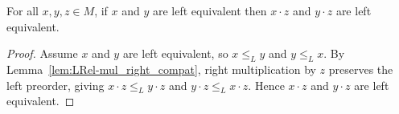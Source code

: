 \begin{lemma}
\label{lem:LEquiv-mul_right_compat}
For all \(x,y,z\in M\), if \(x\) and \(y\) are left equivalent then \(x\cdot z\) and \(y\cdot z\) are left equivalent.
\leanok
{}
\end{lemma}
\begin{proof}
\leanok
Assume \(x\) and \(y\) are left equivalent, so \(x \le_L y\) and \(y \le_L x\).  By Lemma~\ref{lem:LRel-mul_right_compat}, right multiplication by \(z\) preserves the left preorder, giving \(x\cdot z \le_L y\cdot z\) and \(y\cdot z \le_L x\cdot z\).  Hence \(x\cdot z\) and \(y\cdot z\) are left equivalent.
\end{proof}
